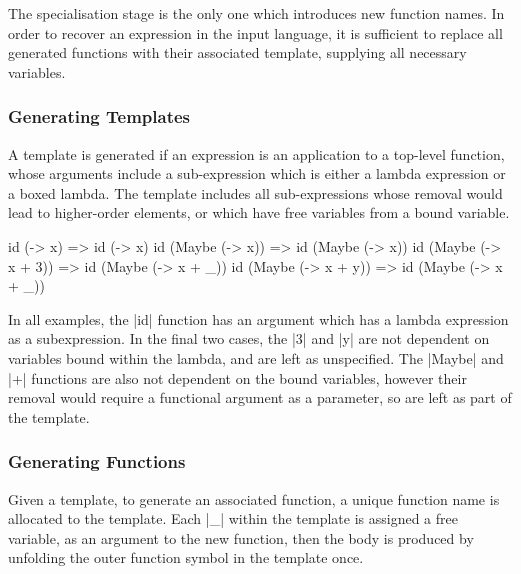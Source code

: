 \documentclass[preprint]{sigplanconf}
\begin{document}
The specialisation stage is the only one which introduces new function names. In order to recover an expression in the input language, it is sufficient to replace all generated functions with their associated template, supplying all necessary variables.

\subsubsection{Generating Templates}

A template is generated if an expression is an application to a top-level function, whose arguments include a sub-expression which is either a lambda expression or a boxed lambda. The template includes all sub-expressions whose removal would lead to higher-order elements, or which have free variables from a bound variable.

\begin{example}
\begin{code}
id (\x -> x)              => id (\x -> x)
id (Maybe (\x -> x))      => id (Maybe (\x -> x))
id (Maybe (\x -> x + 3))  => id (Maybe (\x -> x + _))
id (Maybe (\x -> x + y))  => id (Maybe (\x -> x + _))
\end{code}

In all examples, the |id| function has an argument which has a lambda expression as a subexpression. In the final two cases, the |3| and |y| are not dependent on variables bound within the lambda, and are left as unspecified.  The |Maybe| and |+| functions are also not dependent on the bound variables, however their removal would require a functional argument as a parameter, so are left as part of the template.
\end{example}

\subsubsection{Generating Functions}

Given a template, to generate an associated function, a unique function name is allocated to the template. Each |_| within the template is assigned a free variable, as an argument to the new function, then the body is produced by unfolding the outer function symbol in the template once.
\end{document}
